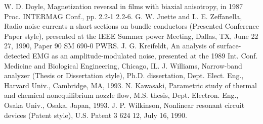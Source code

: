 \documentclass[letterpaper, 10 pt, conference]{ieeeconf}  %
\begin{document}
\begin{thebibliography}{99}
 W. D. Doyle,  Magnetization reversal in films with biaxial anisotropy,  in 1987 Proc. INTERMAG Conf., pp. 2.2-1 2.2-6.
 G. W. Juette and L. E. Zeffanella,  Radio noise currents n short sections on bundle conductors (Presented Conference Paper style),  presented at the IEEE Summer power Meeting, Dallas, TX, June 22 27, 1990, Paper 90 SM 690-0 PWRS.
 J. G. Kreifeldt,  An analysis of surface-detected EMG as an amplitude-modulated noise,  presented at the 1989 Int. Conf. Medicine and Biological Engineering, Chicago, IL.
 J. Williams,  Narrow-band analyzer (Thesis or Dissertation style),  Ph.D. dissertation, Dept. Elect. Eng., Harvard Univ., Cambridge, MA, 1993. 
 N. Kawasaki,  Parametric study of thermal and chemical nonequilibrium nozzle flow,  M.S. thesis, Dept. Electron. Eng., Osaka Univ., Osaka, Japan, 1993.
 J. P. Wilkinson,  Nonlinear resonant circuit devices (Patent style),  U.S. Patent 3 624 12, July 16, 1990. 






\end{thebibliography}
\end{document}
